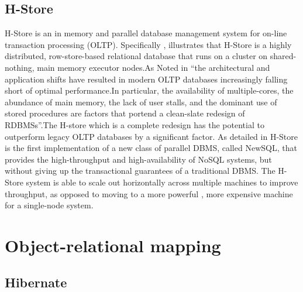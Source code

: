 \subsection{ H-Store}

     H-Store is an in memory and parallel database management system
     for on-line transaction processing (OLTP). Specifically ,
     \cite{www-Hstore} illustrates that H-Store is a highly
     distributed, row-store-based relational database that runs on a
     cluster on shared-nothing, main memory executor nodes.As Noted in
     \cite{kallman2008} ``the architectural and application shifts
     have resulted in modern OLTP databases increasingly falling short
     of optimal performance.In particular, the availability of
     multiple-cores, the abundance of main memory, the lack of user
     stalls, and the dominant use of stored procedures are factors
     that portend a clean-slate redesign of RDBMSs''.The H-store which
     is a complete redesign has the potential to outperform legacy
     OLTP databases by a significant factor.  As detailed in
     \cite{www-Hstorewiki} H-Store is the first implementation of a
     new class of parallel DBMS, called NewSQL, that provides the
     high-throughput and high-availability of NoSQL systems, but
     without giving up the transactional guarantees of a traditional
     DBMS.  The H-Store system is able to scale out horizontally
     across multiple machines to improve throughput, as opposed to
     moving to a more powerful , more expensive machine for a
     single-node system.

\section{Object-relational mapping}

\subsection{ Hibernate}

